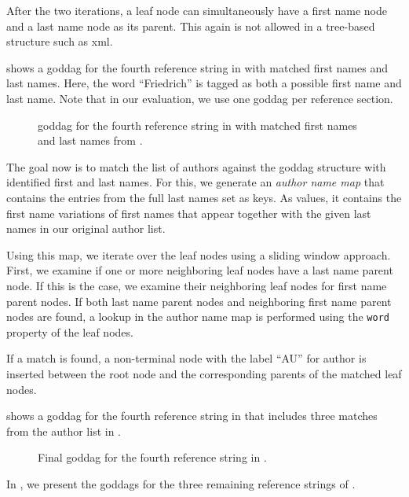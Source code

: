 After the two iterations, a leaf node can simultaneously have a first name node and a last name node as its parent.
This again is not allowed in a tree-based structure such as \gls{xml}.

 shows a \gls{goddag} for the fourth reference string in  with matched first names and last names.
Here, the word ``Friedrich'' is tagged as both a possible first name and last name.
Note that in our evaluation, we use one \gls{goddag} per reference section.
\begin{figure}[t]
  \centering
\resizebox{\linewidth}{!}{%
  
}
\caption{\gls{goddag} for the fourth reference string in  with matched first names and last names from .}
\label{fig:example-goddag-4-names}
\end{figure}

\bigskip

The goal now is to match the list of authors against the \gls{goddag} structure with identified first and last names.
For this, we generate an \textit{author name map} that contains the entries from the full last names set as keys.
As values, it contains the first name variations of first names that appear together with the given last names in our original author list.

Using this map, we iterate over the leaf nodes using a sliding window approach.
First, we examine if one or more neighboring leaf nodes have a last name parent node.
If this is the case, we examine their neighboring leaf nodes for first name parent nodes.
If both last name parent nodes and neighboring first name parent nodes are found, a lookup in the author name map is performed using the \texttt{word} property of the leaf nodes.

If a match is found, a non-terminal node with the label ``AU'' for author is inserted between the root node and the corresponding parents of the matched leaf nodes.

 shows a \gls{goddag} for the fourth reference string in  that includes three matches from the author list in .
\begin{figure}[t]
  \centering
\resizebox{\linewidth}{!}{%
  
}
\caption{Final \gls{goddag} for the fourth reference string in .}
\label{fig:example-goddag-4-final}
\end{figure}
In , we present the \glspl{goddag} for the three remaining reference strings of .

